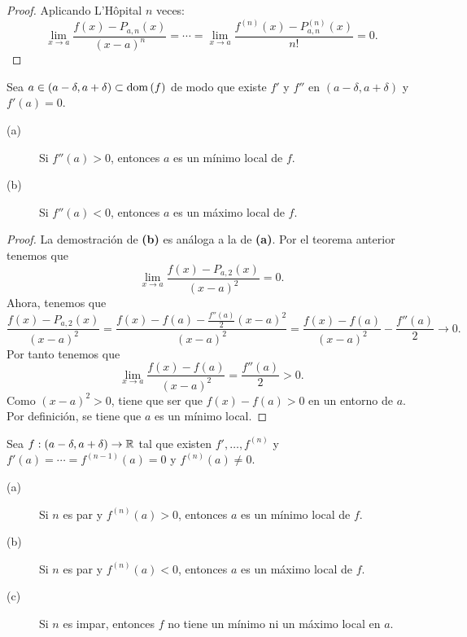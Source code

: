 \begin{proof}
Aplicando L'Hôpital $\displaystyle n $ veces:
\[\lim_{x \to a}\frac{f\left(x\right)-P_{a,n}\left(x\right)}{\left(x-a\right)^{n}} = \cdots =\lim_{x \to a}\frac{f^{\left(n\right) } \left(x\right)- P^{\left(n\right)}_{a,n}\left(x\right)}{n!} = 0 .\]
\end{proof}
\begin{fcolorary}[]
\normalfont Sea $\displaystyle a \in \left(a - \delta, a + \delta \right) \subset \operatorname{dom}\left(f\right) $ de modo que existe $\displaystyle f' $ y $\displaystyle f'' $ en $\displaystyle \left(a - \delta, a + \delta \right) $ y $\displaystyle f'\left(a\right) = 0 $.
\begin{description}
\item[(a)] Si $\displaystyle f''\left(a\right) > 0 $, entonces $\displaystyle a $ es un mínimo local de $\displaystyle f $.
\item[(b)] Si $\displaystyle f''\left(a\right) < 0 $, entonces $\displaystyle a $ es un máximo local de $\displaystyle f $.
\end{description}
\end{fcolorary}
\begin{proof}
La demostración de \textbf{(b)} es análoga a la de \textbf{(a)}. Por el teorema anterior tenemos que
\[\lim_{x \to a}\frac{f\left(x\right)-P_{a,2}\left(x\right)}{\left(x-a\right)^{2}} = 0 .\]
Ahora, tenemos que
\[\frac{f\left(x\right)-P_{a,2}\left(x\right)}{\left(x-a\right)^{2}} = \frac{f\left(x\right)-f\left(a\right)-\frac{f''\left(a\right)}{2}\left(x-a\right)^{2}}{\left(x-a\right)^{2}} = \frac{f\left(x\right)-f\left(a\right)}{\left(x-a\right)^{2}} -\frac{f''\left(a\right)}{2} \to 0.\]
Por tanto tenemos que 
\[\lim_{x \to a}\frac{f\left(x\right)-f\left(a\right)}{\left(x-a\right)^{2}} = \frac{f''\left(a\right)}{2} > 0 .\]
Como $\displaystyle \left(x-a\right)^{2} > 0 $, tiene que ser que $\displaystyle f\left(x\right) - f\left(a\right) > 0 $ en un entorno de $\displaystyle a $. Por definición, se tiene que $\displaystyle a $ es un mínimo local. 
\end{proof}
\begin{fcolorary}[]
\normalfont Sea $\displaystyle f : \left(a-\delta, a + \delta \right)\to \mathbb{R} $ tal que existen $\displaystyle f', \ldots, f^{\left(n\right)} $ y $\displaystyle f'\left(a\right) = \cdots = f^{\left(n-1\right)}\left(a\right) = 0$ y $\displaystyle f^{\left(n\right)}\left(a\right) \neq 0 $.
\begin{description}
\item[(a)] Si $\displaystyle n $ es par y $\displaystyle f^{\left(n\right)}\left(a\right) > 0 $, entonces $\displaystyle a $ es un mínimo local de $\displaystyle f $.
\item[(b)] Si $\displaystyle n $ es par y $\displaystyle f^{\left(n\right)}\left(a\right) < 0 $, entonces $\displaystyle a $ es un máximo local de $\displaystyle f $.
\item[(c)] Si $\displaystyle n $ es impar, entonces $\displaystyle f $ no tiene un mínimo ni un máximo local en $\displaystyle a $.
\end{description}
\end{fcolorary}
